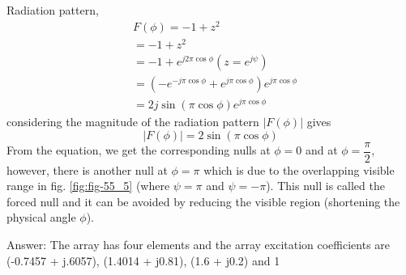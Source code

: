 \begin{exmp}
Radiation pattern, 
\begin{align*}
&F(\phi)=-1+z^{2}\\
&=-1+z^{2}\\
&=-1+e^{j2\pi\cos\phi} (z=e^{j\psi})\\
&=(-e^{-j\pi\cos\phi} + e^{j\pi\cos\phi} )e^{j\pi\cos\phi}\\
&=2j\sin(\pi\cos\phi)e^{j\pi\cos\phi}
\end{align*}
considering the magnitude of the radiation pattern $|F(\phi)|$ gives
\begin{equation}
|F(\phi)|= 2\sin(\pi\cos\phi)
\label{eqn50}
\end{equation}
From the equation, we get the corresponding nulls at $\phi = 0$ and at $\phi = \dfrac{\pi}{2}$, however, there is another null at $\phi =\pi$ which is due to the overlapping visible range in fig. \ref{fig:fig-55_5} (where $\psi = \pi$ and $\psi = -\pi$). This null is called the forced null and it can be avoided by reducing the visible region (shortening the physical angle $\phi$).
\end{exmp}
\begin{ExerciseList}
\Exercise[title=DIY]
\end{ExerciseList}
Answer: The array has four elements and the array excitation coefficients are (-0.7457 + j.6057), (1.4014 + j0.81), (1.6 + j0.2) and 1 